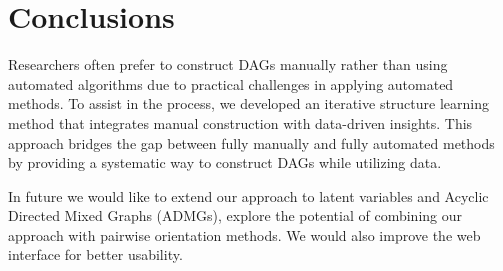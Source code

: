 \documentclass{uai2025} %
\begin{document}
\section{Conclusions}
Researchers often prefer to construct DAGs manually rather than using automated
algorithms due to practical challenges in applying automated methods. To assist
in the process, we developed an iterative structure learning method that
integrates manual construction with data-driven insights. This approach bridges
the gap between fully manually and fully automated methods by providing a
systematic way to construct DAGs while utilizing data.

In future we would like to extend our approach to latent variables and Acyclic
Directed Mixed Graphs (ADMGs), explore the potential of combining our approach
with pairwise orientation methods. We would also improve the web interface for
better usability. 


\newpage


\end{document}
